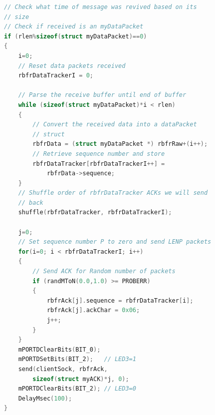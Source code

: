 \documentclass[12pt]{article}
\begin{document}
\begin{lstlisting}[language=c, 
caption=Sliding Window - Data Packet Detector and Handler,
label=lst:slidedatapacket]
// Check what time of message was revived based on its
// size
// Check if received is an myDataPacket
if (rlen%sizeof(struct myDataPacket)==0)
{
    i=0;
    // Reset data packets received
    rbfrDataTrackerI = 0;
    
    // Parse the receive buffer until end of buffer
    while (sizeof(struct myDataPacket)*i < rlen)
    {
        // Convert the received data into a dataPacket 
        // struct
        rbfrData = (struct myDataPacket *) rbfrRaw+(i++);
        // Retrieve sequence number and store
        rbfrDataTracker[rbfrDataTrackerI++] = 
            rbfrData->sequence;
    }
    // Shuffle order of rbfrDataTracker ACKs we will send 
    // back
    shuffle(rbfrDataTracker, rbfrDataTrackerI);
    
    j=0;
    // Set sequence number P to zero and send LENP packets
    for(i=0; i < rbfrDataTrackerI; i++)
    {
        // Send ACK for Random number of packets
        if (randMToN(0.0,1.0) >= PROBERR)
        {
            rbfrAck[j].sequence = rbfrDataTracker[i];
            rbfrAck[j].ackChar = 0x06;
            j++;
        }
    }
    mPORTDClearBits(BIT_0);
    mPORTDSetBits(BIT_2);   // LED3=1
    send(clientSock, rbfrAck, 
        sizeof(struct myACK)*j, 0);
    mPORTDClearBits(BIT_2); // LED3=0
    DelayMsec(100);
}
\end{lstlisting}
\end{document}

